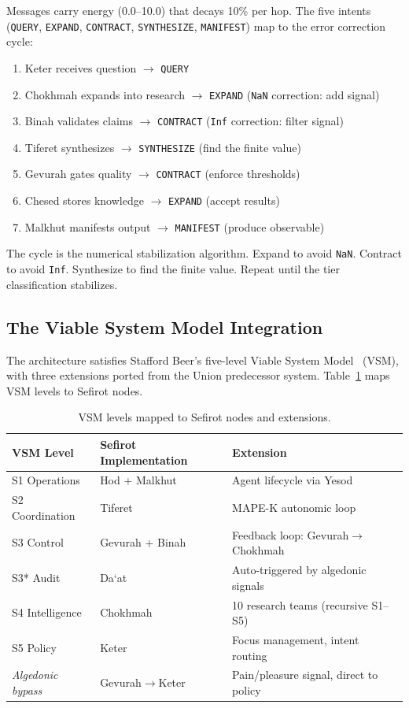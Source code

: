 \documentclass[11pt]{article}
\theoremstyle{definition}
\theoremstyle{remark}
\newcommand{\NaN}{\texttt{NaN}}
\newcommand{\Inf}{\texttt{Inf}}
\begin{document}
Messages carry energy (0.0--10.0) that decays 10\% per hop.  The five intents
(\texttt{QUERY}, \texttt{EXPAND}, \texttt{CONTRACT}, \texttt{SYNTHESIZE},
\texttt{MANIFEST}) map to the error correction cycle:
\begin{enumerate}
  \item Keter receives question $\to$ \texttt{QUERY}
  \item Chokhmah expands into research $\to$ \texttt{EXPAND} (\NaN{} correction:
    add signal)
  \item Binah validates claims $\to$ \texttt{CONTRACT} (\Inf{} correction: filter
    signal)
  \item Tiferet synthesizes $\to$ \texttt{SYNTHESIZE} (find the finite value)
  \item Gevurah gates quality $\to$ \texttt{CONTRACT} (enforce thresholds)
  \item Chesed stores knowledge $\to$ \texttt{EXPAND} (accept results)
  \item Malkhut manifests output $\to$ \texttt{MANIFEST} (produce observable)
\end{enumerate}

The cycle is the numerical stabilization algorithm.  Expand to avoid \NaN{}.
Contract to avoid \Inf{}.  Synthesize to find the finite value.  Repeat until
the tier classification stabilizes.

\subsection{The Viable System Model Integration}
\label{sec:vsm}

The architecture satisfies Stafford Beer's five-level Viable System
Model~\cite{beer1972,beer1979} (VSM), with three extensions ported from the Union
predecessor system.  Table~\ref{tab:vsm} maps VSM levels to Sefirot nodes.

\begin{table}[ht]
\centering
\caption{VSM levels mapped to Sefirot nodes and extensions.}
\label{tab:vsm}
\begin{tabular}{@{}lll@{}}
\toprule
\textbf{VSM Level} & \textbf{Sefirot Implementation} & \textbf{Extension} \\
\midrule
S1 Operations   & Hod + Malkhut        & Agent lifecycle via Yesod \\
S2 Coordination & Tiferet              & MAPE-K autonomic loop \\
S3 Control      & Gevurah + Binah      & Feedback loop: Gevurah$\to$Chokhmah \\
S3* Audit       & Da\textquoteleft at  & Auto-triggered by algedonic signals \\
S4 Intelligence & Chokhmah             & 10 research teams (recursive S1--S5) \\
S5 Policy       & Keter                & Focus management, intent routing \\
\emph{Algedonic bypass} & Gevurah$\to$Keter & Pain/pleasure signal, direct to policy \\
\bottomrule
\end{tabular}
\end{table}
\end{document}
